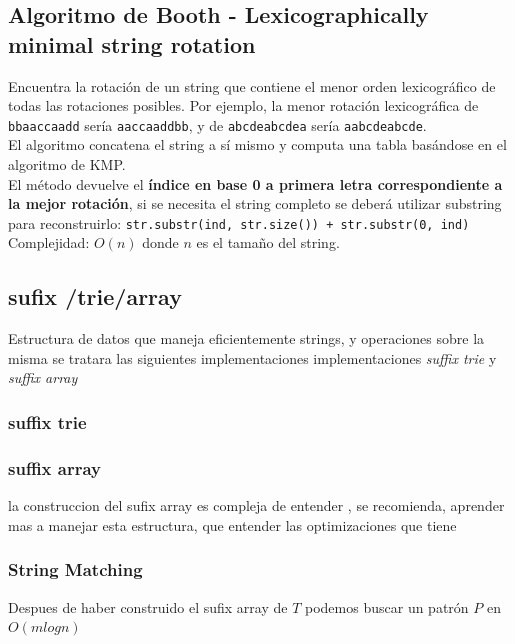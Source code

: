 \documentclass[10pt,letterpaper,twocolumn]{article}
\newcommand{\source}[1]{
  
  \dotfill
}
\begin{document}
  \subsection{Algoritmo de Booth - Lexicographically minimal string rotation}
    Encuentra la rotación de un string que contiene el menor orden lexicográfico de todas las rotaciones posibles. Por ejemplo, la menor rotación lexicográfica de \texttt{bbaaccaadd} sería \texttt{aaccaaddbb}, y de \texttt{abcdeabcdea} sería \texttt{aabcdeabcde}. \\
    El algoritmo concatena el string a sí mismo y computa una tabla basándose en el algoritmo de KMP.\\
    El método devuelve el \textbf{índice en base 0 a primera letra correspondiente a la mejor rotación}, si se necesita el string completo se deberá utilizar substring para reconstruirlo: \texttt{str.substr(ind, str.size()) + str.substr(0, ind)}\\
Complejidad: $O(n)$ donde $n$ es el tamaño del string.
    \source{./src/booths.cpp}

	\subsection{sufix /trie/array}
	Estructura de datos que maneja eficientemente strings, y operaciones sobre la misma
	se tratara las siguientes implementaciones implementaciones  \textit{suffix trie} y \textit{suffix array} 
	
	\subsubsection{suffix trie}
	\source{./src/sufix-Array-Trie/sufixTrie.cpp}
	
	\subsubsection{suffix array}
	la construccion del sufix array es compleja de entender , se recomienda, aprender mas a manejar esta estructura, que entender las optimizaciones que tiene 
	\source{./src/sufix-Array-Trie/sufixArray.cpp}
	
	\subsubsection{String Matching}
	Despues de haber construido el sufix array de $T$ podemos buscar un patrón $P$ en $O(mlogn)$
	\source{./src/sufix-Array-Trie/SufixArrayStringMatching.cpp}
	
\end{document}
